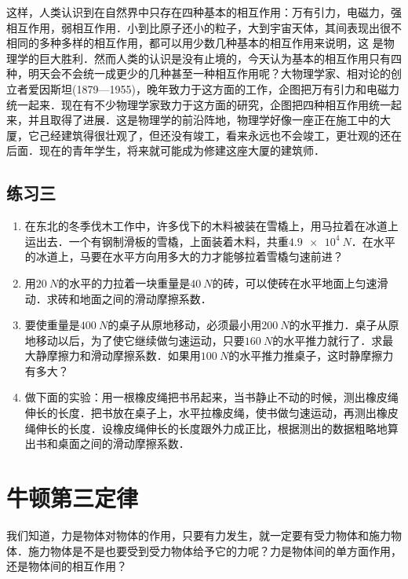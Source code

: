 这样，人类认识到在自然界中只存在四种基本的相互作用：万有引力，电磁力，强相互作用，弱相互作用．小到比原子还小的粒子，大到宇宙天体，其间表现出很不相同的多种多样的相互作用，都可以用少数几种基本的相互作用来说明，这
是物理学的巨大胜利．然而人类的认识是没有止境的，今天认为基本的相互作用只有四种，明天会不会统一成更少的几种甚至一种相互作用呢？大物理学家、相对论的创立者爱因斯坦(1879—1955)，晚年致力于这方面的工作，企图把万有引力和电磁力统一起来．现在有不少物理学家致力于这方面的研究，企图把四种相互作用统一起来，并且取得了进展．这是物理学的前沿阵地，物理学好像一座正在施工中的大厦，它己经建筑得很壮观了，但还没有竣工，看来永远也不会竣工，更壮观的还在后面．现在的青年学生，将来就可能成为修建这座大厦的建筑师．

\subsection*{练习三}
\begin{enumerate}
    \item  在东北的冬季伐木工作中，许多伐下的木料被装在雪橇上，用马拉着在冰道上运出去．一个有钢制滑板的雪橇，上面装着木料，共重$\qty{4.9e4}{N}$．在水平的冰道上，马要在水平方向用多大的力才能够拉着雪橇匀速前进？
    \item  用$\qty{20}{N}$的水平的力拉着一块重量是$\qty{40}{N}$的砖，可以使砖在水平地面上匀速滑动．求砖和地面之间的滑动摩擦系数．
    \item  要使重量是$\qty{400}{N}$的桌子从原地移动，必须最小用$\qty{200}{N}$的水平推力．桌子从原地移动以后，为了使它继续做匀速运动，只要$\qty{160}{N}$的水平推力就行了．求最大静摩擦力和滑动摩擦系数．如果用$\qty{100}{N}$的水平推力推桌子，这时静摩擦力有多大？
    \item  做下面的实验：用一根橡皮绳把书吊起来，当书静止不动的时候，测出橡皮绳伸长的长度．把书放在桌子上，水平拉橡皮绳，使书做匀速运动，再测出橡皮绳伸长的长度．设橡皮绳伸长的长度跟外力成正比，根据测出的数据粗略地算出书和桌面之间的滑动摩擦系数．
\end{enumerate}

\newpage

\section{牛顿第三定律}

我们知道，力是物体对物体的作用，只要有力发生，就一定要有受力物体和施力物体．施力物体是不是也要受到受力物体给予它的力呢？力是物体间的单方面作用，还是物体间的相互作用？

